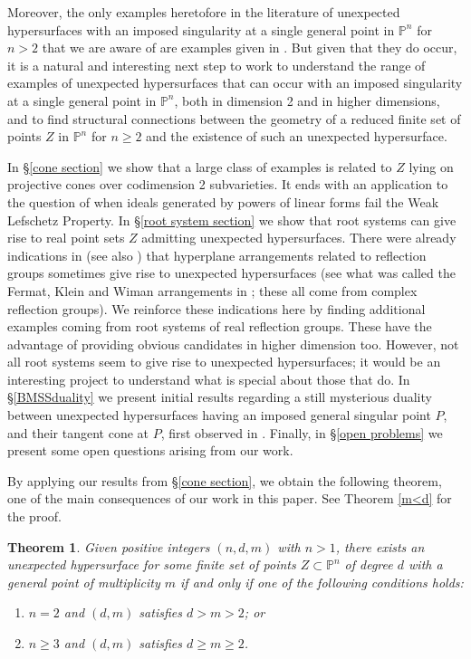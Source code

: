 \documentclass[12pt]{amsart}
\numberwithin{equation}{section}
\newtheorem{theorem}{Theorem}[section]
\theoremstyle{definition}
\newcommand{\PP}{ \ensuremath{\mathbb{P}}}
\begin{document}
Moreover, the only examples heretofore in the literature
of unexpected hypersurfaces with an imposed singularity at a single general point in $\PP^n$ for $n>2$ 
that we are aware of are examples given in \cite{BMSS}.
But given that they do occur, it is a natural and interesting next step to work to understand the range of examples of unexpected hypersurfaces that can occur
with an imposed singularity at a single general point in $\PP^n$,
both in dimension 2 and in higher dimensions,
and to find structural connections between the geometry of a reduced finite set of points $Z$ in $\PP^n$ for $n\geq 2$
and the existence of such an unexpected hypersurface. 

In \S\ref{cone section} we show that a large class of examples is related to $Z$ lying on projective cones 
over codimension 2 subvarieties. It ends with an application to the question of when ideals generated by 
powers of linear forms fail the Weak Lefschetz Property.
In \S\ref{root system section} we show that root systems can give rise to real point sets $Z$
admitting unexpected hypersurfaces. There were already indications
 in \cite{CHMN} (see also \cite{I}) that hyperplane arrangements related to reflection groups sometimes 
give rise to unexpected hypersurfaces (see what was called the Fermat, Klein and Wiman arrangements in \cite{CHMN};
these all come from complex reflection groups). We reinforce these indications here by finding additional
examples coming from root systems of real reflection groups. These have the advantage
of providing obvious candidates in higher dimension too.
However, not all root systems seem to give rise to unexpected hypersurfaces;
it would be an interesting project to understand what is special about those that do. 
In \S\ref{BMSSduality} we present initial results regarding a still mysterious duality between 
unexpected hypersurfaces having an imposed general singular point $P$,
and their tangent cone at $P$, first observed in \cite{BMSS}. Finally, in \S\ref{open problems} we present some open questions arising from our work.

By applying our results from \S\ref{cone section},
we obtain the following theorem, one of the main consequences of our work in this paper.
See Theorem \ref{m<d} for the proof.

\begin{theorem}\label{mainThm}
Given positive integers $(n,d,m)$ with $n>1$, there exists an unexpected hypersurface for some finite set of points 
$Z \subset  \PP^n$ of degree $d$ with a general point of multiplicity $m$ if and only if one of the following conditions holds:
\begin{enumerate}[label={(\roman*)}]
\item[(i)] $n=2$ and $(d,m)$ satisfies $d > m > 2$; or
\item[(ii)] $n \ge 3$ and $(d,m)$ satisfies $d \geq m \geq 2$.
\end{enumerate}
\end{theorem}
\end{document}
